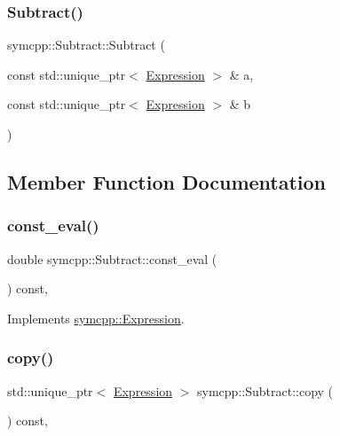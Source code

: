 \subsubsection{\texorpdfstring{Subtract()}{Subtract()}\hspace{0.1cm}{\footnotesize\ttfamily [2/2]}}
{\footnotesize\ttfamily symcpp\+::\+Subtract\+::\+Subtract (\begin{DoxyParamCaption}\item[{const std\+::unique\+\_\+ptr$<$ \mbox{\hyperlink{classsymcpp_1_1Expression}{Expression}} $>$ \&}]{a,  }\item[{const std\+::unique\+\_\+ptr$<$ \mbox{\hyperlink{classsymcpp_1_1Expression}{Expression}} $>$ \&}]{b }\end{DoxyParamCaption})}



\subsection{Member Function Documentation}
\mbox{\label{classsymcpp_1_1Subtract_a619e8733e2b9c07f9bcdb1c82781fad9}} 
\subsubsection{\texorpdfstring{const\_eval()}{const\_eval()}}
{\footnotesize\ttfamily double symcpp\+::\+Subtract\+::const\+\_\+eval (\begin{DoxyParamCaption}{ }\end{DoxyParamCaption}) const\hspace{0.3cm}{\ttfamily [override]}, {\ttfamily [virtual]}}



Implements \mbox{\hyperlink{classsymcpp_1_1Expression_a81c8069347f586cb5632338d97c278ad}{symcpp\+::\+Expression}}.

\mbox{\label{classsymcpp_1_1Subtract_a97b707b4c72caa44342fe7952d616a4d}} 
\subsubsection{\texorpdfstring{copy()}{copy()}}
{\footnotesize\ttfamily std\+::unique\+\_\+ptr$<$ \mbox{\hyperlink{classsymcpp_1_1Expression}{Expression}} $>$ symcpp\+::\+Subtract\+::copy (\begin{DoxyParamCaption}{ }\end{DoxyParamCaption}) const\hspace{0.3cm}{\ttfamily [override]}, {\ttfamily [virtual]}}



